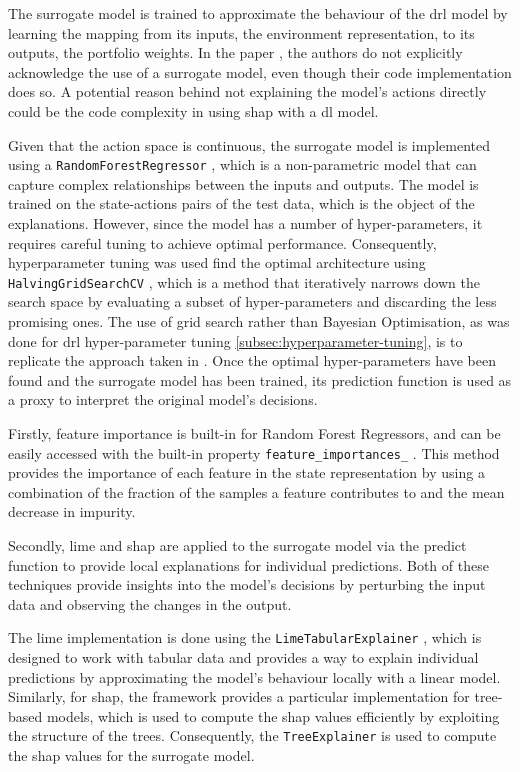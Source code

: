 The surrogate model is trained to approximate the behaviour of the \acrshort{drl} model by learning the mapping from its inputs, the environment representation, to its outputs, the portfolio weights. In the paper \cite{de-La-Rica-Escudero2025}, the authors do not explicitly acknowledge the use of a surrogate model, even though their code implementation does so. A potential reason behind not explaining the model's actions directly could be the code complexity in using \acrshort{shap} with a \acrshort{dl} model. 

Given that the action space is continuous, the surrogate model is implemented using a \texttt{RandomForestRegressor} \cite{sklearnRandomForest}, which is a non-parametric model that can capture complex relationships between the inputs and outputs. The model is trained on the state-actions pairs of the test data, which is the object of the explanations. However, since the model has a number of hyper-parameters, it requires careful tuning to achieve optimal performance. Consequently, hyperparameter tuning was used find the optimal architecture using \texttt{HalvingGridSearchCV} \cite{sklearnHalvingGridSearch}, which is a method that iteratively narrows down the search space by evaluating a subset of hyper-parameters and discarding the less promising ones. The use of grid search rather than Bayesian Optimisation, as was done for \acrshort{drl} hyper-parameter tuning \ref{subsec:hyperparameter-tuning}, is to replicate the approach taken in \cite{de-La-Rica-Escudero2025}. Once the optimal hyper-parameters have been found and the surrogate model has been trained, its prediction function is used as a proxy to interpret the original model's decisions.

Firstly, feature importance is built-in for Random Forest Regressors, and can be easily accessed with the built-in property \texttt{feature\_importances\_} \cite{sklearnFeatureImportance}. This method provides the importance of each feature in the state representation by using a combination of the fraction of the samples a feature contributes to and the mean decrease in impurity.

Secondly, \acrshort{lime} and \acrshort{shap} are applied to the surrogate model via the predict function to provide local explanations for individual predictions. Both of these techniques provide insights into the model's decisions by perturbing the input data and observing the changes in the output. 

The \acrshort{lime} implementation is done using the \texttt{LimeTabularExplainer} \cite{LimeTabularExplainer}, which is designed to work with tabular data and provides a way to explain individual predictions by approximating the model's behaviour locally with a linear model. Similarly, for \acrshort{shap}, the framework provides a particular implementation for tree-based models, which is used to compute the \acrshort{shap} values efficiently by exploiting the structure of the trees. Consequently, the \texttt{TreeExplainer} \cite{ShapTreeExplainer} is used to compute the \acrshort{shap} values for the surrogate model.

